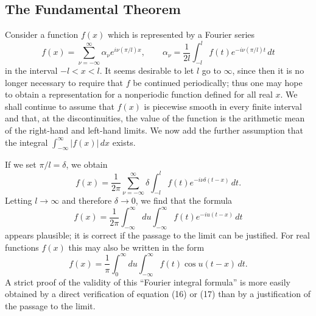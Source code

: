 \subsection{The Fundamental Theorem}
Consider a function $f(x)$ which is represented by a Fourier series
\[
f(x)=\sum_{\nu=-\infty}^{\infty}\alpha_\nu e^{i\nu(\pi/l)x},
\qquad
\alpha_\nu=\frac1{2l}\int_{-l}^{l}f(t)e^{-i\nu(\pi/l)t}\,dt
\]
in the interval $-l<x<l$. It seems desirable to let $l$ go to $\infty$, since then it is no longer necessary to require that $f$ be continued periodically; thus one may hope to obtain a representation for a nonperiodic function defined for all real $x$. We shall continue to assume that $f(x)$ is piecewise smooth in every finite interval and that, at the discontinuities, the value of the function is the arithmetic mean of the right-hand and left-hand limits. We now add the further assumption that the integral $\int_{-\infty}^{\infty}|f(x)|\,dx$ exists.

If we set $\pi/l=\delta$, we obtain
\[
f(x)=\frac1{2\pi}\sum_{\nu=-\infty}^{\infty}\delta
\int_{-l}^{l}f(t)e^{-i\nu\delta(t-x)}\,dt.
\]
Letting $l\to\infty$ and therefore $\delta\to0$, we find that the formula
\begin{equation}
f(x)=\frac1{2\pi}\int_{-\infty}^{\infty}du
\int_{-\infty}^{\infty}f(t)e^{-iu(t-x)}\,dt
\tag{16}
\end{equation}
appears plausible; it is correct if the passage to the limit can be justified. For real functions $f(x)$ this may also be written in the form
\begin{equation}
f(x)=\frac1\pi\int_0^{\infty}du
\int_{-\infty}^{\infty}f(t)\cos u(t-x)\,dt.
\tag{17}
\end{equation}
A strict proof of the validity of this ``Fourier integral formula'' is more easily obtained by a direct verification of equation (16) or (17) than by a justification of the passage to the limit.

